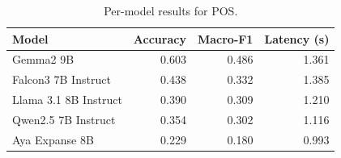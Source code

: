 \begin{table}[t]
\centering
\caption{Per-model results for POS.}
\label{tab:appendix-pos-analysis}
\begin{tabular}{lrrr}
\toprule
Model & Accuracy & Macro-F1 & Latency (s) \\
\midrule
Gemma2 9B & 0.603 & 0.486 & 1.361 \\
Falcon3 7B Instruct & 0.438 & 0.332 & 1.385 \\
Llama 3.1 8B Instruct & 0.390 & 0.309 & 1.210 \\
Qwen2.5 7B Instruct & 0.354 & 0.302 & 1.116 \\
Aya Expanse 8B & 0.229 & 0.180 & 0.993 \\
\bottomrule
\end{tabular}
\end{table}

